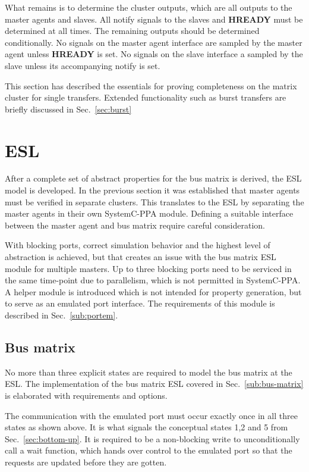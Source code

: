 What remains is to determine the cluster outputs, which are all outputs to the master agents and slaves. All notify signals to the slaves and \textbf{HREADY} must be determined at all times. The remaining outputs should be determined conditionally. No signals on the master agent interface are sampled by the master agent unless \textbf{HREADY} is set. No signals on the slave interface a sampled by the slave unless its accompanying notify is set. \par 
This section has described the essentials for proving completeness on the matrix cluster for single transfers. Extended functionality such as burst transfers are briefly discussed in Sec.~\ref{sec:burst}
 

\section{ESL}
After a complete set of abstract properties for the bus matrix is derived, the ESL model is developed. In the previous section it was established that master agents must be verified in separate clusters. This translates to the ESL by separating the master agents in their own SystemC-PPA module. Defining a suitable interface between the master agent and bus matrix require careful consideration. \par
With blocking ports, correct simulation behavior and the highest level of abstraction is achieved, but that creates an issue with the bus matrix ESL module for multiple masters. Up to three blocking ports need to be serviced in the same time-point due to parallelism, which is not permitted in SystemC-PPA. A helper module is introduced which is not intended for property generation, but to serve as an emulated port interface. The requirements of this module is described in Sec.~\ref{sub:portem}.

\subsection{Bus matrix}
\label{sub:bus-matrix-design}
No more than three explicit states are required to model the bus matrix at the ESL. The implementation of the bus matrix ESL covered in Sec.~\ref{sub:bus-matrix} is elaborated with requirements and options. \par
The communication with the emulated port must occur exactly once in all three states as shown above. It is what signals the conceptual states 1,2 and 5 from Sec.~\ref{sec:bottom-up}. It is required to be a non-blocking write to unconditionally call a wait function, which hands over control to the emulated port so that the requests are updated before they are gotten. 

